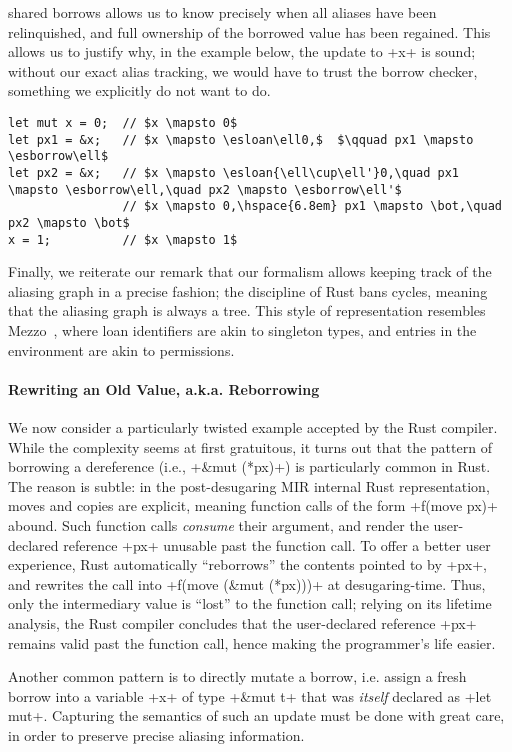 \documentclass[acmsmall,screen]{acmart}
\newcommand\esborrow[1]{\ensuremath{\mathsf{borrow}^s\,#1}}
\newcommand\esloan[2]{\ensuremath{\mathsf{loan}^s\,\{#1\}\,#2}}
\newcommand\myparagraph[1]{\emph{#1}.\ }
\let\myparagraph\paragraph
\begin{document}
shared borrows allows us to know precisely when all aliases
have been relinquished, and full ownership of the borrowed value has been
regained. This allows us to justify why, in the example below, the update to
\li+x+ is sound; without our exact alias tracking, we would have to trust the
borrow checker, something we explicitly do not want to do.
\begin{verbatim}
let mut x = 0;  // $x \mapsto 0$
let px1 = &x;   // $x \mapsto \esloan\ell0,$  $\qquad px1 \mapsto \esborrow\ell$
let px2 = &x;   // $x \mapsto \esloan{\ell\cup\ell'}0,\quad px1 \mapsto \esborrow\ell,\quad px2 \mapsto \esborrow\ell'$
                // $x \mapsto 0,\hspace{6.8em} px1 \mapsto \bot,\quad px2 \mapsto \bot$
x = 1;          // $x \mapsto 1$
\end{verbatim}
\fi
Finally, we reiterate our remark that our formalism allows keeping track of the aliasing
graph in a precise fashion; the discipline of Rust bans cycles, meaning that the
aliasing graph is always a tree. This style of representation resembles
Mezzo~\cite{balabonski2016design}, where loan identifiers are akin to singleton
types, and entries in the environment are akin to permissions.

\myparagraph{Rewriting an Old Value, a.k.a. Reborrowing}
We now consider a particularly twisted example accepted by the Rust compiler. While the
complexity seems at first gratuitous, it turns out that the pattern of borrowing
a dereference (i.e., \li+&mut (*px)+) is particularly common in Rust. The reason
is subtle: in the post-desugaring MIR internal Rust representation, moves and
copies are explicit, meaning function calls of the form \li+f(move px)+ abound.
Such function calls \emph{consume} their argument, and render the
user-declared reference \li+px+ unusable past the function call.
To offer a better user experience, Rust automatically ``reborrows'' the
contents pointed to by \li+px+, and rewrites the call into \li+f(move (&mut (*px)))+ at desugaring-time.
Thus, only the intermediary value is ``lost'' to the function call;
relying on its lifetime analysis, the Rust compiler concludes that the
user-declared reference \li+px+ remains valid past the function call, hence
making the programmer's life easier.

Another common pattern is to directly mutate a borrow, i.e. assign a fresh
borrow into a variable \li+x+ of type \li+&mut t+ that was \emph{itself}
declared as \li+let mut+.
Capturing the semantics of such an update must be done with great care, in order
to preserve precise aliasing information.
\end{document}
